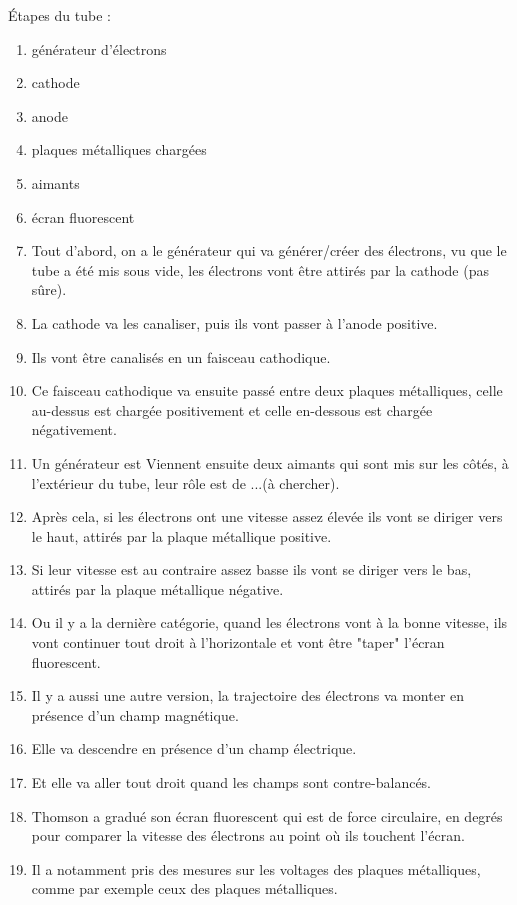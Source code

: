 \documentclass[../main.tex]{subfiles}
\begin{document}
Étapes du tube : \\
\begin{enumerate}
    \item générateur d'électrons
    \item cathode
    \item anode
    \item plaques métalliques chargées
    \item aimants
    \item écran fluorescent
    \item Tout d'abord, on a le générateur qui va générer/créer des électrons, vu que le tube a été mis sous vide, les électrons vont être attirés par la cathode (pas sûre).
    \item  La cathode va les canaliser, puis ils vont passer à l'anode positive.
    \item  Ils vont être canalisés en un faisceau cathodique.\\
    \item Ce faisceau cathodique va ensuite passé entre deux plaques métalliques, celle au-dessus est chargée positivement et celle en-dessous est chargée négativement.
    \item  Un générateur est Viennent ensuite deux aimants qui sont mis sur les côtés, à l'extérieur du tube, leur rôle est de ...(à chercher).
    \item Après cela, si les électrons ont une vitesse assez élevée ils vont se diriger vers le haut, attirés par la plaque métallique positive.
    \item  Si leur vitesse est au contraire assez basse ils vont se diriger vers le bas, attirés par la plaque métallique négative.
    \item Ou il y a la dernière catégorie, quand les électrons vont à la bonne vitesse, ils vont continuer tout droit à l'horizontale et vont être "taper" l'écran fluorescent.
    \item Il y a aussi une autre version, la trajectoire des électrons va monter en présence d'un champ magnétique.
    \item Elle va descendre en présence d'un champ électrique.
    \item Et elle va aller tout droit quand les champs sont contre-balancés. 
    \item Thomson a gradué son écran fluorescent qui est de force circulaire, en degrés pour comparer la vitesse des électrons au point où ils touchent l'écran. 
    \item Il a notamment pris des mesures sur les voltages des plaques métalliques, comme par exemple ceux des plaques métalliques. 

\end{enumerate}
\end{document}
